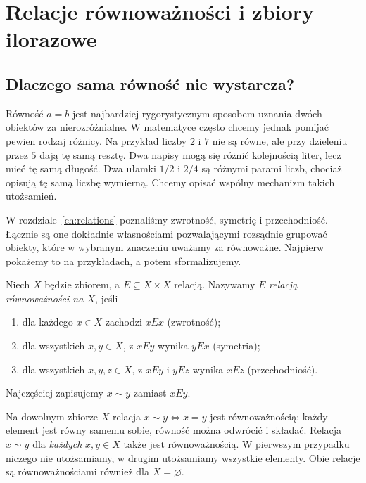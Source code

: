 \chapter{Relacje równoważności i zbiory ilorazowe}\label{ch:equivalence}

\section{Dlaczego sama równość nie wystarcza?}\label{sec:eq-motivation}
Równość $a=b$ jest najbardziej rygorystycznym sposobem uznania dwóch
obiektów za nierozróżnialne. W matematyce często chcemy jednak pomijać
pewien rodzaj różnicy. Na przykład liczby $2$ i $7$ nie są równe,
ale przy dzieleniu przez $5$ dają tę samą resztę. Dwa napisy mogą się
różnić kolejnością liter, lecz mieć tę samą długość. Dwa ułamki
$1/2$ i $2/4$ są różnymi parami liczb, chociaż opisują tę samą
liczbę wymierną. Chcemy opisać wspólny mechanizm takich utożsamień.

W rozdziale~\ref{ch:relations} poznaliśmy zwrotność, symetrię i
przechodniość. Łącznie są one dokładnie własnościami pozwalającymi
rozsądnie grupować obiekty, które w wybranym znaczeniu uważamy za
równoważne. Najpierw pokażemy to na przykładach, a potem sformalizujemy.

\begin{definicja}\label{def:equivalence}
Niech $X$ będzie zbiorem, a $E\subseteq X\times X$ relacją.
Nazywamy $E$ \emph{relacją równoważności na $X$}, jeśli
\begin{enumerate}[label=(\roman*)]
\item dla każdego $x\in X$ zachodzi $xEx$ (zwrotność);
\item dla wszystkich $x,y\in X$, z $xEy$ wynika $yEx$ (symetria);
\item dla wszystkich $x,y,z\in X$, z $xEy$ i $yEz$ wynika $xEz$
(przechodniość).
\end{enumerate}
Najczęściej zapisujemy $x\sim y$ zamiast $xEy$.
\end{definicja}

\begin{przyklad}
Na dowolnym zbiorze $X$ relacja $x\sim y\iff x=y$ jest
równoważnością: każdy element jest równy samemu sobie, równość
można odwrócić i składać. Relacja $x\sim y$ dla \emph{każdych}
$x,y\in X$ także jest równoważnością. W pierwszym przypadku
niczego nie utożsamiamy, w drugim utożsamiamy wszystkie elementy.
Obie relacje są równoważnościami również dla $X=\varnothing$.
\end{przyklad}

